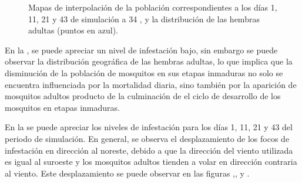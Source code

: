 \begin{figure}[!htbp]
    \caption{\label{fig:niveles-infestacion-34} Mapas de interpolación de la población correspondientes a los días 1, 11, 21 y 43 de simulación a 34 \textcelsius, y la distribución de las hembras adultas (puntos en azul). }
\end{figure}

En la , se puede apreciar un nivel de infestación bajo, sin
embargo se puede observar la distribución geográfica de las hembras adultas, lo que implica que la
disminución de la población de mosquitos en sus etapas inmaduras no solo se encuentra influenciada
por la mortalidad diaria, sino también por la aparición de mosquitos adultos producto de la
culminación de el ciclo de desarrollo de los mosquitos en etapas inmaduras.

En la  se puede apreciar los niveles de infestación
para los días 1, 11, 21 y 43  del periodo de simulación. En general, se observa el
desplazamiento de los focos de infestación en dirección al noreste, debido a que la dirección del
viento utilizada es igual al suroeste y los mosquitos adultos tienden a volar en dirección
contraria al viento. Este desplazamiento se puede observar en las figuras
,,
 y .
